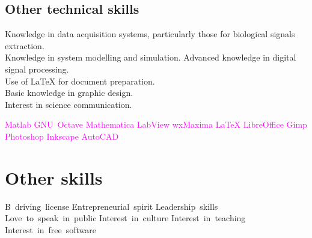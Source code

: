 \documentclass[11pt,a4paper,sans,spanish]{moderncv}
\begin{document}
\subsection{Other technical skills}
Knowledge in data acquisition systems, particularly those for biological signals extraction.
\protect\\[0.4em]
Knowledge in system modelling and simulation.
Advanced knowledge in digital signal processing.
\protect\\[0.4em]
Use of LaTeX for document preparation.
\protect\\[0.4em]
Basic knowledge in graphic design.
\protect\\[0.4em]
Interest in science communication.

\begin{center}
\textcolor{magenta}{
Matlab \quad{} GNU~Octave \quad{} Mathematica \quad{} LabView \quad{} wxMaxima \quad{} LaTeX \quad{} LibreOffice \quad{} Gimp \quad{} Photoshop \quad{} Inkscape \quad{} AutoCAD
}
\end{center}


\section{Other skills}
\begin{center}
B~driving~license \quad{} Entrepreneurial~spirit \quad{} Leadership~skills \quad{} Love~to~speak~in~public \quad{} Interest~in~culture \quad{} Interest~in~teaching \quad{} Interest~in~free~software
\end{center}
\end{document}
